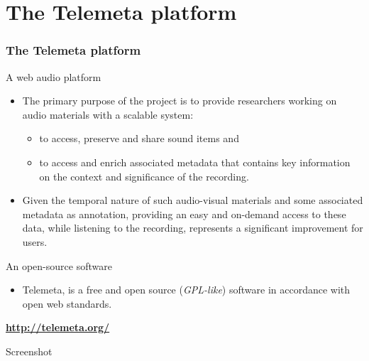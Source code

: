 \documentclass[final, hyperref, table]{beamer}
\begin{document}
\section[Telemeta]{The Telemeta platform}\label{sec:Telemeta}
\begin{frame}
  \frametitle{The Telemeta platform}
  \begin{block}{A web audio platform}
    \begin{itemize}
    \item The primary purpose of the project is to provide researchers
      working on audio materials with a scalable system:
      \begin{itemize}\footnotesize
      \item to access, preserve and share \alert{sound items} and
      \item to access and enrich \alert{associated metadata} that
        contains key information on the context and significance of
        the recording.
      \end{itemize}
    \item Given the temporal nature of such audio-visual materials and
      some associated metadata as annotation, providing an easy and
      on-demand access to these data, while listening to the
      recording, represents a significant improvement for users.
    \end{itemize}
  \end{block}
  \begin{block}{An open-source software}
    \begin{itemize}
    \item Telemeta, is a free and open source (\emph{GPL-like})
      software in accordance with open web standards.
    \end{itemize}
    \vspace{-0.5cm}
    \begin{center}
\hspace{1cm}
      \colorbox{yellow!40}{\textbf{\url{http://telemeta.org/}}}
    \end{center}
  \end{block}
\end{frame}

\begin{frame}[plain]{Screenshot}
  \begin{center}
  \end{center}

\end{frame}
\end{document}
